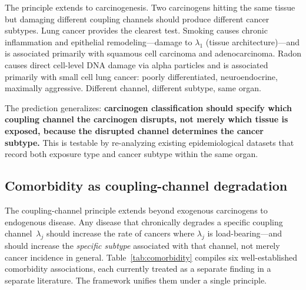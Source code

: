 \documentclass[11pt]{article}
\theoremstyle{definition}
\theoremstyle{remark}
\begin{document}
The principle extends to carcinogenesis. Two carcinogens hitting the
same tissue but damaging different coupling channels should produce
different cancer subtypes. Lung cancer provides the clearest test.
Smoking causes chronic inflammation and epithelial remodeling---damage
to $\lambda_1$ (tissue architecture)---and is associated primarily
with squamous cell carcinoma and adenocarcinoma. Radon causes direct
cell-level DNA damage via alpha particles and is associated primarily
with small cell lung cancer: poorly differentiated, neuroendocrine,
maximally aggressive. Different channel, different subtype, same
organ.

The prediction generalizes: \textbf{carcinogen classification should
specify which coupling channel the carcinogen disrupts, not merely
which tissue is exposed, because the disrupted channel determines
the cancer subtype.} This is testable by re-analyzing existing
epidemiological datasets that record both exposure type and cancer
subtype within the same organ.

\subsection{Comorbidity as coupling-channel degradation}

The coupling-channel principle extends beyond exogenous carcinogens
to endogenous disease. Any disease that chronically degrades a
specific coupling channel~$\lambda_j$ should increase the rate of
cancers where $\lambda_j$ is load-bearing---and should increase the
\emph{specific subtype} associated with that channel, not merely
cancer incidence in general. Table~\ref{tab:comorbidity} compiles
six well-established comorbidity associations, each currently treated
as a separate finding in a separate literature. The framework unifies
them under a single principle.
\end{document}
